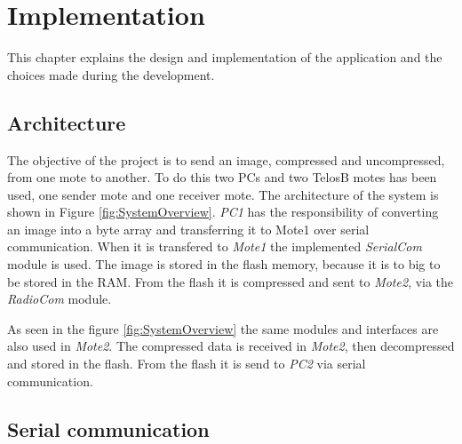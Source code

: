 \chapter{Implementation}
\label{chp:impl}

This chapter explains the design and implementation of the application and the choices made during the development.

\section{Architecture}
The objective of the project is to send an image, compressed and uncompressed, from one mote to another. To do this two PCs and two TelosB motes has been used, one sender mote and one receiver mote. The architecture of the system is shown in Figure \ref{fig:SystemOverview}. \emph{PC1} has the responsibility of converting an image into a byte array and transferring it to Mote1 over serial communication. When it is transfered to \emph{Mote1} the implemented \emph{SerialCom} module is used. The image is stored in the flash memory, because it is to big to be stored in the RAM. From the flash it is compressed and sent to \emph{Mote2}, via the \emph{RadioCom} module.


As seen in the figure \ref{fig:SystemOverview} the same modules and interfaces are also used in \emph{Mote2}. The compressed data is received in \emph{Mote2}, then decompressed and stored in the flash. From the flash it is send to \emph{PC2} via serial communication. 


\section{Serial communication}

